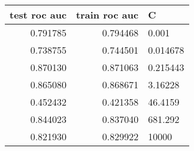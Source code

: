 \begin{tabular}{rrl}
\toprule
 test roc auc &  train roc auc &         C \\
\midrule
     0.791785 &       0.794468 &     0.001 \\
     0.738755 &       0.744501 &  0.014678 \\
     0.870130 &       0.871063 &  0.215443 \\
     0.865080 &       0.868671 &   3.16228 \\
     0.452432 &       0.421358 &   46.4159 \\
     0.844023 &       0.837040 &   681.292 \\
     0.821930 &       0.829922 &     10000 \\
\bottomrule
\end{tabular}
